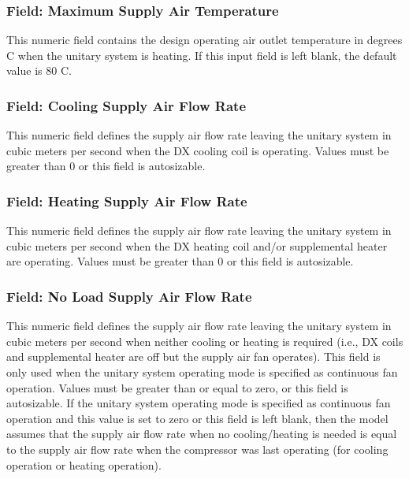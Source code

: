 \subsubsection{Field: Maximum Supply Air Temperature}\label{field-maximum-supply-air-temperature-2-000}

This numeric field contains the design operating air outlet temperature in degrees C when the unitary system is heating. If this input field is left blank, the default value is 80 C.

\subsubsection{Field: Cooling Supply Air Flow Rate}\label{field-cooling-supply-air-flow-rate-2-000}

This numeric field defines the supply air flow rate leaving the unitary system in cubic meters per second when the DX cooling coil is operating. Values must be greater than 0 or this field is autosizable.

\subsubsection{Field: Heating Supply Air Flow Rate}\label{field-heating-supply-air-flow-rate-2-000}

This numeric field defines the supply air flow rate leaving the unitary system in cubic meters per second when the DX heating coil and/or supplemental heater are operating. Values must be greater than 0 or this field is autosizable.

\subsubsection{Field: No Load Supply Air Flow Rate}\label{field-no-load-supply-air-flow-rate-2-000}

This numeric field defines the supply air flow rate leaving the unitary system in cubic meters per second when neither cooling or heating is required (i.e., DX coils and supplemental heater are off but the supply air fan operates). This field is only used when the unitary system operating mode is specified as continuous fan operation. Values must be greater than or equal to zero, or this field is autosizable. If the unitary system operating mode is specified as continuous fan operation and this value is set to zero or this field is left blank, then the model assumes that the supply air flow rate when no cooling/heating is needed is equal to the supply air flow rate when the compressor was last operating (for cooling operation or heating operation).

